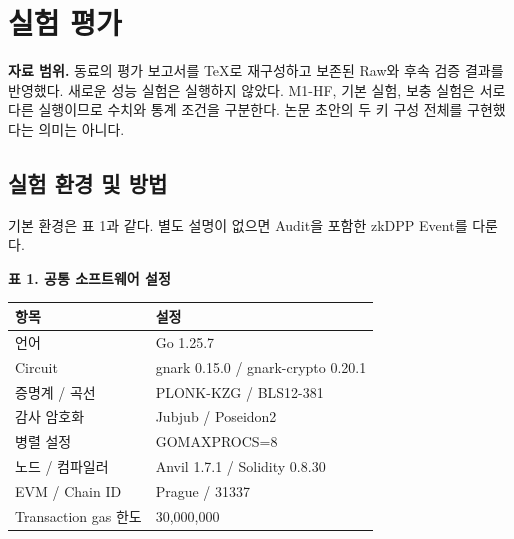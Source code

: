 \section{실험 평가}
\textbf{자료 범위.} 동료의 평가 보고서를 TeX로 재구성하고 보존된 Raw와 후속 검증 결과를 반영했다.
새로운 성능 실험은 실행하지 않았다.
M1-HF, 기본 실험, 보충 실험은 서로 다른 실행이므로 수치와 통계 조건을 구분한다.
논문 초안의 두 키 구성 전체를 구현했다는 의미는 아니다.\par
\subsection{실험 환경 및 방법}
기본 환경은 표 1과 같다. 별도 설명이 없으면 Audit을 포함한 zkDPP Event를 다룬다.
\begin{center}\small\setlength{\tabcolsep}{6pt}
    \textbf{표 1. 공통 소프트웨어 설정}\par\smallskip
    \begin{tabular}{@{}ll@{}}\toprule
        \textbf{항목}        & \textbf{설정}                        \\ \midrule
        언어                 & Go 1.25.7                          \\
        Circuit            & gnark 0.15.0 / gnark-crypto 0.20.1 \\
        증명계 / 곡선           & PLONK-KZG / BLS12-381              \\
        감사 암호화             & Jubjub / Poseidon2                 \\
        병렬 설정              & GOMAXPROCS=8                       \\
        노드 / 컴파일러          & Anvil 1.7.1 / Solidity 0.8.30      \\
        EVM / Chain ID     & Prague / 31337                     \\
        Transaction gas 한도 & 30,000,000                         \\
        \bottomrule\end{tabular}\end{center}


